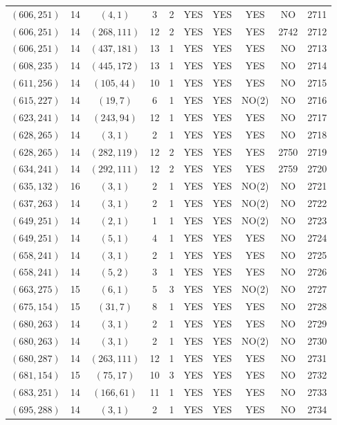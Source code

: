 \begin{longtable}{|c|c|c|c|c|c|c|c|c|c|}
$(606, 251)$ & 14 & $(4, 1)$ & 3 & 2 & YES & YES & YES & NO & 2711\\
$(606, 251)$ & 14 & $(268, 111)$ & 12 & 2 & YES & YES & YES & 2742 & 2712\\
$(606, 251)$ & 14 & $(437, 181)$ & 13 & 1 & YES & YES & YES & NO & 2713\\
$(608, 235)$ & 14 & $(445, 172)$ & 13 & 1 & YES & YES & YES & NO & 2714\\
$(611, 256)$ & 14 & $(105, 44)$ & 10 & 1 & YES & YES & YES & NO & 2715\\
$(615, 227)$ & 14 & $(19, 7)$ & 6 & 1 & YES & YES & NO(2) & NO & 2716\\
$(623, 241)$ & 14 & $(243, 94)$ & 12 & 1 & YES & YES & YES & NO & 2717\\
$(628, 265)$ & 14 & $(3, 1)$ & 2 & 1 & YES & YES & YES & NO & 2718\\
$(628, 265)$ & 14 & $(282, 119)$ & 12 & 2 & YES & YES & YES & 2750 & 2719\\
$(634, 241)$ & 14 & $(292, 111)$ & 12 & 2 & YES & YES & YES & 2759 & 2720\\
$(635, 132)$ & 16 & $(3, 1)$ & 2 & 1 & YES & YES & NO(2) & NO & 2721\\
$(637, 263)$ & 14 & $(3, 1)$ & 2 & 1 & YES & YES & NO(2) & NO & 2722\\
$(649, 251)$ & 14 & $(2, 1)$ & 1 & 1 & YES & YES & NO(2) & NO & 2723\\
$(649, 251)$ & 14 & $(5, 1)$ & 4 & 1 & YES & YES & YES & NO & 2724\\
$(658, 241)$ & 14 & $(3, 1)$ & 2 & 1 & YES & YES & YES & NO & 2725\\
$(658, 241)$ & 14 & $(5, 2)$ & 3 & 1 & YES & YES & YES & NO & 2726\\
$(663, 275)$ & 15 & $(6, 1)$ & 5 & 3 & YES & YES & NO(2) & NO & 2727\\
$(675, 154)$ & 15 & $(31, 7)$ & 8 & 1 & YES & YES & YES & NO & 2728\\
$(680, 263)$ & 14 & $(3, 1)$ & 2 & 1 & YES & YES & YES & NO & 2729\\
$(680, 263)$ & 14 & $(3, 1)$ & 2 & 1 & YES & YES & NO(2) & NO & 2730\\
$(680, 287)$ & 14 & $(263, 111)$ & 12 & 1 & YES & YES & YES & NO & 2731\\
$(681, 154)$ & 15 & $(75, 17)$ & 10 & 3 & YES & YES & YES & NO & 2732\\
$(683, 251)$ & 14 & $(166, 61)$ & 11 & 1 & YES & YES & YES & NO & 2733\\
$(695, 288)$ & 14 & $(3, 1)$ & 2 & 1 & YES & YES & YES & NO & 2734\\

\end{longtable}
